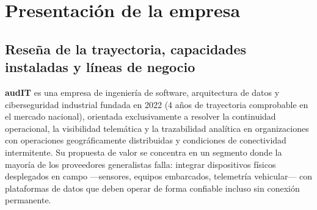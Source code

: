 \section{Presentación de la empresa}

\subsection{Reseña de la trayectoria, capacidades instaladas y líneas de negocio}

\textbf{audIT} es una empresa de ingeniería de software, arquitectura de datos y ciberseguridad industrial fundada en 2022 (4 años de trayectoria comprobable en el mercado nacional), orientada exclusivamente a resolver la continuidad operacional, la visibilidad telemática y la trazabilidad analítica en organizaciones con operaciones geográficamente distribuidas y condiciones de conectividad intermitente. Su propuesta de valor se concentra en un segmento donde la mayoría de los proveedores generalistas falla: integrar dispositivos físicos desplegados en campo ---sensores, equipos embarcados, telemetría vehicular--- con plataformas de datos que deben operar de forma confiable incluso sin conexión permanente.

